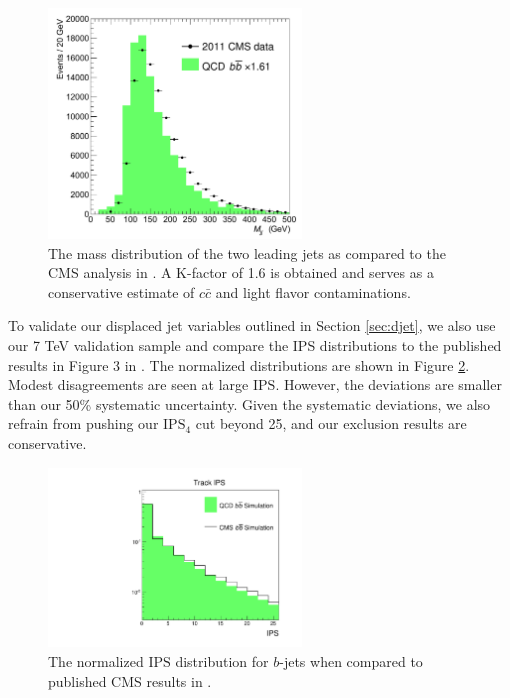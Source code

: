 \documentclass{JHEP3}
\newcommand{\IPS}{\textrm{IPS}}
\begin{document}
\begin{figure}[ht]
\centering
\includegraphics[width=0.6\textwidth]{CMS_mjj.pdf}
\caption{The mass distribution of the two leading jets as compared to the CMS analysis in \cite{Chatrchyan:2013qga}.
 A K-factor of 1.6 is obtained and serves as a conservative estimate of $c\bar{c}$ and light flavor contaminations.}
\label{fig:validation_mass}
\end{figure}

To validate our displaced jet variables outlined in Section \ref{sec:djet}, we also use our 7 TeV validation sample and compare the IPS 
distributions to the published results in Figure 3 in \cite{Rizzi:2006ms}. The normalized distributions are shown in Figure \ref{fig:validation_IPS}.
 Modest disagreements are seen at large $\IPS$. However, the deviations are smaller than our 50\% systematic uncertainty. Given the systematic deviations, 
we also refrain from pushing our $\IPS_4$ cut beyond 25, and our exclusion results are conservative. 

\begin{figure}[ht!]
\centering
\includegraphics[width=0.6\textwidth]{unsigned_IPS.pdf}
\caption{The normalized $\IPS$ distribution for $b$-jets when compared to published CMS results in \cite{Rizzi:2006ms}. }
\label{fig:validation_IPS}
\end{figure}
\end{document}
